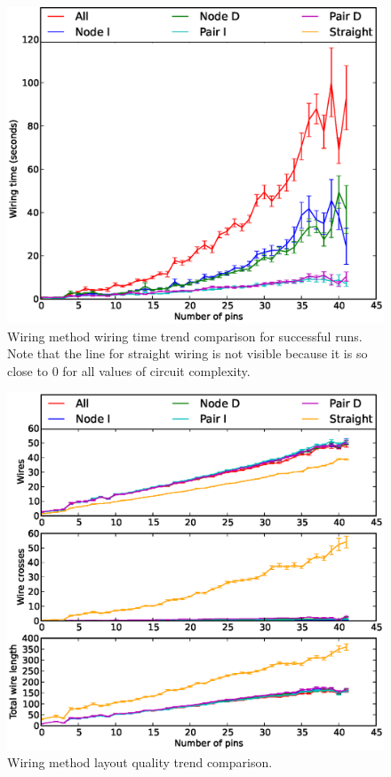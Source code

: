 \begin{figure}
\begin{center}
\includegraphics[width=\textwidth]{Images/wiring_time_trend_comparison.eps}
\caption[Wiring method wiring time trend comparison]{Wiring method wiring time
trend comparison for successful runs. Note that the line for straight wiring is
not visible because it is so close to $0$ for all values of circuit complexity.}
\label{fig:wiring_time_trend}
\end{center}
\end{figure}

\begin{figure}
\begin{center}
\includegraphics[width=\textwidth]{Images/wiring_quality_trend_comparison.eps}
\caption[Wiring method layout quality trend comparison]{Wiring method layout
quality trend comparison.}
\label{fig:wiring_quality_trend}
\end{center}
\end{figure}

